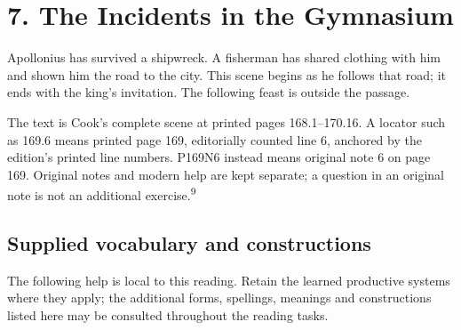 \section*{7. The Incidents in the Gymnasium}

Apollonius has survived a shipwreck. A fisherman has shared clothing with him and shown him the road to the city. This scene begins as he follows that road; it ends with the king’s invitation. The following feast is outside the passage.

The text is Cook’s complete scene at printed pages 168.1–170.16. A locator such as 169.6 means printed page 169, editorially counted line 6, anchored by the edition’s printed line numbers. P169N6 instead means original note 6 on page 169. Original notes and modern help are kept separate; a question in an original note is not an additional exercise.\textsuperscript{9}

\subsection*{Supplied vocabulary and constructions}

The following help is local to this reading. Retain the learned productive systems where they apply; the additional forms, spellings, meanings and constructions listed here may be consulted throughout the reading tasks.

